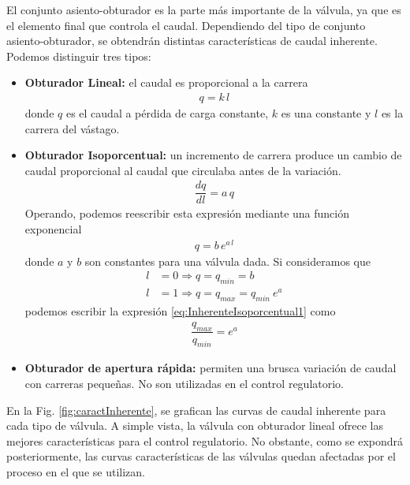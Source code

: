 El conjunto asiento-obturador es la parte más importante de la válvula, ya que
es el elemento final que controla el caudal.
Dependiendo del tipo de conjunto asiento-obturador, se obtendrán distintas
características de caudal inherente.
Podemos distinguir tres tipos:
\begin{itemize}
  \item \textbf{Obturador Lineal:} el caudal es proporcional a la carrera
  \begin{align}
	q = k\,l
	\label{eq:inherenteLineal}
  \end{align}
  donde $q$ es el caudal a pérdida de carga constante, $k$ es una constante y
$l$ es la carrera del vástago.

  \item \textbf{Obturador Isoporcentual:}
  un incremento de carrera produce un cambio de caudal proporcional al caudal
que circulaba antes de la variación.
  \begin{align}
    \dfrac{dq}{dl} = a \, q
  \end{align}
  Operando, podemos reescribir esta expresión mediante una función exponencial
\begin{align}
 q = b\,e^{a\,l}
 \label{eq:InherenteIsoporcentual1}
\end{align}
  donde $a$ y $b$ son constantes para una válvula dada.
  Si consideramos que
    \begin{align}
        l &= 0 \Rightarrow q = q_{min} = b\\
        l &= 1 \Rightarrow q = q_{max} = q_{min} \:e^a
    \end{align}
    podemos escribir la expresión \eqref{eq:InherenteIsoporcentual1} como
    \begin{align}
      \dfrac{q_{max}}{q_{min}} = e^a
    \end{align}
  \item \textbf{Obturador de apertura rápida:} permiten una brusca variación de
caudal con carreras pequeñas.
  No son utilizadas en el control regulatorio.
\end{itemize}

En la Fig. \ref{fig:caractInherente}, se grafican las curvas de caudal
inherente para cada tipo de válvula.
A simple vista, la válvula con obturador lineal ofrece las mejores
características para el control regulatorio.
No obstante, como se expondrá posteriormente, las curvas características de las
válvulas quedan afectadas por el proceso en el que se utilizan.


